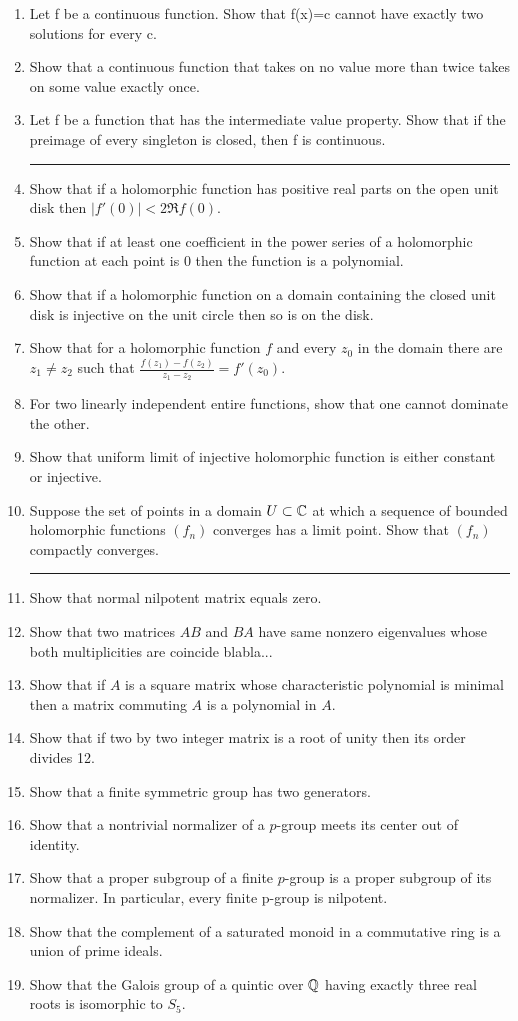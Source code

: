\documentclass[11pt]{article}
\begin{document}
\begin{enumerate}
\hrule
\item Let f be a continuous function. Show that f(x)=c cannot have exactly two solutions for every c.
\item Show that a continuous function that takes on no value more than twice takes on some value exactly once.
\item Let f be a function that has the intermediate value property. Show that if the preimage of every singleton is closed, then f is continuous.

\hrule
\item Show that if a holomorphic function has positive real parts on the open unit disk then $|f'(0)|<2\Re f(0)$.
\item Show that if at least one coefficient in the power series of a holomorphic function at each point is 0 then the function is a polynomial.
\item Show that if a holomorphic function on a domain containing the closed unit disk is injective on the unit circle then so is on the disk.
\item Show that for a holomorphic function $f$ and every $z_0$ in the domain there are $z_1\ne z_2$ such that $\frac{f(z_1)-f(z_2)}{z_1-z_2}=f'(z_0)$.
\item For two linearly independent entire functions, show that one cannot dominate the other.
\item Show that uniform limit of injective holomorphic function is either constant or injective.
\item Suppose the set of points in a domain $U\subset\mathbb{C}$ at which a sequence of bounded holomorphic functions $(f_n)$ converges has a limit point. Show that $(f_n)$ compactly converges.

\hrule
\item Show that normal nilpotent matrix equals zero.
\item Show that two matrices $AB$ and $BA$ have same nonzero eigenvalues whose both multiplicities are coincide blabla...
\item Show that if $A$ is a square matrix whose characteristic polynomial is minimal then a matrix commuting $A$ is a polynomial in $A$.
\item Show that if two by two integer matrix is a root of unity then its order divides 12.
\item Show that a finite symmetric group has two generators.
\item Show that a nontrivial normalizer of a $p$-group meets its center out of identity.
\item Show that a proper subgroup of a finite $p$-group is a proper subgroup of its normalizer. In particular, every finite p-group is nilpotent.
\item Show that the complement of a saturated monoid in a commutative ring is a union of prime ideals.
\item Show that the Galois group of a quintic over $\mathbb{Q}$ having exactly three real roots is isomorphic to $S_5$.


\end{enumerate}
\end{document}
